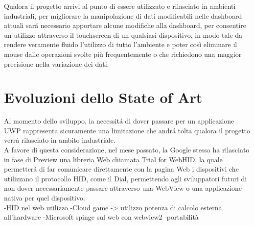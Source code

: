 Qualora il progetto arrivi al punto di essere utilizzato e rilasciato in ambienti industriali, per migliorare la manipolazione di dati modificabili nelle dashboard attuali sará necessario apportare alcune modifiche alla dashboard, per consentire un utilizzo attraverso il touchscreen di un qualsiasi dispositivo, in modo tale da rendere veramente fluido l’utilizzo di tutto l’ambiente e poter così eliminare il mouse dalle operazioni svolte più frequentemente o che richiedono una maggior precisione nella variazione dei dati.\\



\section{Evoluzioni dello State of Art}


Al momento dello sviluppo, la necessitá di dover passare per un applicazione UWP rappresenta sicuramente una limitazione che andrá tolta qualora il progetto verrá rilasciato in ambito industriale.\\

A favore di questa considerazione, nel mese passato, la Google stessa ha rilasciato in fase di Preview una libreria Web chiamata Trial for WebHID, la quale permetterá di far comunicare direttamente con la pagina Web i dispositivi che utilizzano il protocollo HID, come il Dial, permettendo agli sviluppatori futuri di non dover necessariamente passare attraverso una WebView o una applicazione nativa per quel dispositivo.\\

-HID nel web utilizzo
-Cloud game -> utilizzo potenza di calcolo esterna all'hardware
-Microsoft spinge sul web con webview2
-portabilità






